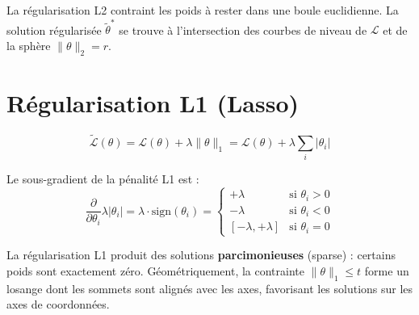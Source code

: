 \begin{intuition}[title=\textbf{Effet g\'eom\'etrique de L2}]
La r\'egularisation L2 contraint les poids \`a rester dans une boule
euclidienne. La solution r\'egularis\'ee $\tilde{\theta}^*$ se trouve \`a
l'intersection des courbes de niveau de $\mathcal{L}$ et de la sph\`ere
$\|\theta\|_2 = r$.
\end{intuition}

\section{R\'egularisation L1 (Lasso)}
\label{sec:l1-reg}

\begin{formules}[title=\textbf{Fonction de co\^ut r\'egularis\'ee L1}]
\begin{equation}
\tilde{\mathcal{L}}(\theta) = \mathcal{L}(\theta) + \lambda \|\theta\|_1
= \mathcal{L}(\theta) + \lambda \sum_{i} |\theta_i|
\label{eq:l1-cost}
\end{equation}
\end{formules}

Le sous-gradient de la p\'enalit\'e L1 est :
\begin{equation}
\frac{\partial}{\partial \theta_i} \lambda |\theta_i| =
\lambda \cdot \text{sign}(\theta_i) =
\begin{cases}
+\lambda & \text{si } \theta_i > 0 \\
-\lambda & \text{si } \theta_i < 0 \\
[-\lambda, +\lambda] & \text{si } \theta_i = 0
\end{cases}
\end{equation}

\begin{remarque}[Parcimonie de L1]
La r\'egularisation L1 produit des solutions \textbf{parcimonieuses} (sparse) :
certains poids sont exactement z\'ero. G\'eom\'etriquement, la contrainte
$\|\theta\|_1 \leq t$ forme un losange dont les sommets sont align\'es avec
les axes, favorisant les solutions sur les axes de coordonn\'ees.
\end{remarque}

\begin{center}
\end{center}

